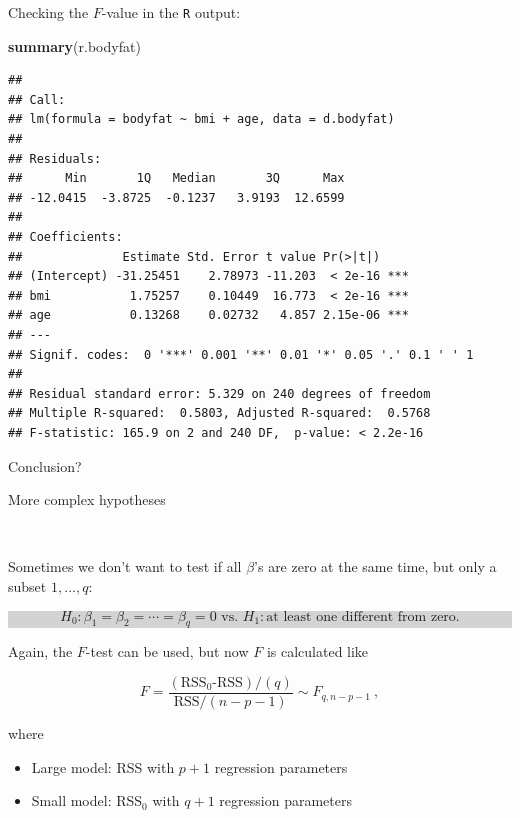\documentclass[10pt,ignorenonframetext,]{beamer}
\newenvironment{Shaded}{\begin{snugshade}}{\end{snugshade}}
\newcommand{\KeywordTok}[1]{\textcolor[rgb]{0.13,0.29,0.53}{\textbf{#1}}}
\newcommand{\NormalTok}[1]{#1}
\providecommand{\tightlist}{%
  \setlength{\itemsep}{0pt}\setlength{\parskip}{0pt}}
\begin{document}
\begin{frame}[fragile]

Checking the \(F\)-value in the \texttt{R} output:

\scriptsize

\begin{Shaded}
\begin{Highlighting}[]
\KeywordTok{summary}\NormalTok{(r.bodyfat)}
\end{Highlighting}
\end{Shaded}

\begin{verbatim}
## 
## Call:
## lm(formula = bodyfat ~ bmi + age, data = d.bodyfat)
## 
## Residuals:
##      Min       1Q   Median       3Q      Max 
## -12.0415  -3.8725  -0.1237   3.9193  12.6599 
## 
## Coefficients:
##              Estimate Std. Error t value Pr(>|t|)    
## (Intercept) -31.25451    2.78973 -11.203  < 2e-16 ***
## bmi           1.75257    0.10449  16.773  < 2e-16 ***
## age           0.13268    0.02732   4.857 2.15e-06 ***
## ---
## Signif. codes:  0 '***' 0.001 '**' 0.01 '*' 0.05 '.' 0.1 ' ' 1
## 
## Residual standard error: 5.329 on 240 degrees of freedom
## Multiple R-squared:  0.5803, Adjusted R-squared:  0.5768 
## F-statistic: 165.9 on 2 and 240 DF,  p-value: < 2.2e-16
\end{verbatim}

\normalsize
Conclusion?

\end{frame}

\begin{frame}

\begin{block}{More complex hypotheses}

\(~\)

Sometimes we don't want to test if all \(\beta\)'s are zero at the same
time, but only a subset \(1,\ldots , q\):

\begin{center}
\colorbox{lightgray}{\begin{minipage}{11cm}
\vspace{-2mm}
$$ H_0: \beta_1=\beta_2=\cdots= \beta_q =0 \text{  vs.  } H_1: \text{at least one different from zero}.$$
\end{minipage}}
\end{center}

Again, the \(F\)-test can be used, but now \(F\) is calculated like

\[F=\frac{(\text{RSS$_0$-RSS})/(q)}{\text{RSS}/(n-p-1)} \sim F_{q,n-p-1} \ ,\]

where

\begin{itemize}
\tightlist
\item
  Large model: RSS with \(p+1\) regression parameters
\item
  Small model: RSS\(_0\) with \(q+1\) regression parameters
\end{itemize}

\end{block}

\end{frame}
\end{document}

